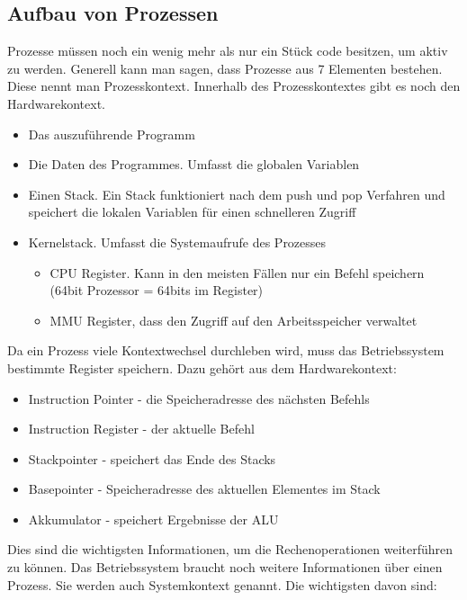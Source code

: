 \subsection{Aufbau von Prozessen}

Prozesse müssen noch ein wenig mehr als nur ein Stück code besitzen, um aktiv zu werden. Generell kann man sagen, dass Prozesse aus 7 Elementen bestehen.
Diese nennt man Prozesskontext. Innerhalb des Prozesskontextes gibt es noch den Hardwarekontext.
\begin{itemize}
    \setlength\itemsep{0pt}
    \item Das auszuführende Programm
    \item Die Daten des Programmes. Umfasst die globalen Variablen
    \item Einen Stack. Ein Stack funktioniert nach dem push und pop Verfahren und speichert die lokalen Variablen für einen schnelleren Zugriff
    \item Kernelstack. Umfasst die Systemaufrufe des Prozesses
          \begin{itemize}
              \item CPU Register. Kann in den meisten Fällen nur ein Befehl speichern (64bit Prozessor = 64bits im Register)
              \item MMU Register, dass den Zugriff auf den Arbeitsspeicher verwaltet
          \end{itemize}
\end{itemize}

Da ein Prozess viele Kontextwechsel durchleben wird, muss das Betriebssystem bestimmte Register speichern. Dazu gehört aus dem Hardwarekontext:

\begin{itemize}
    \setlength\itemsep{0pt}
    \item Instruction Pointer - die Speicheradresse des nächsten Befehls
    \item Instruction Register - der aktuelle Befehl
    \item Stackpointer - speichert das Ende des Stacks
    \item Basepointer - Speicheradresse des aktuellen Elementes im Stack
    \item Akkumulator - speichert Ergebnisse der ALU
\end{itemize}

Dies sind die wichtigsten Informationen, um die Rechenoperationen weiterführen zu können. Das Betriebssystem braucht noch weitere Informationen über einen Prozess. Sie werden auch Systemkontext genannt. Die wichtigsten davon sind:

